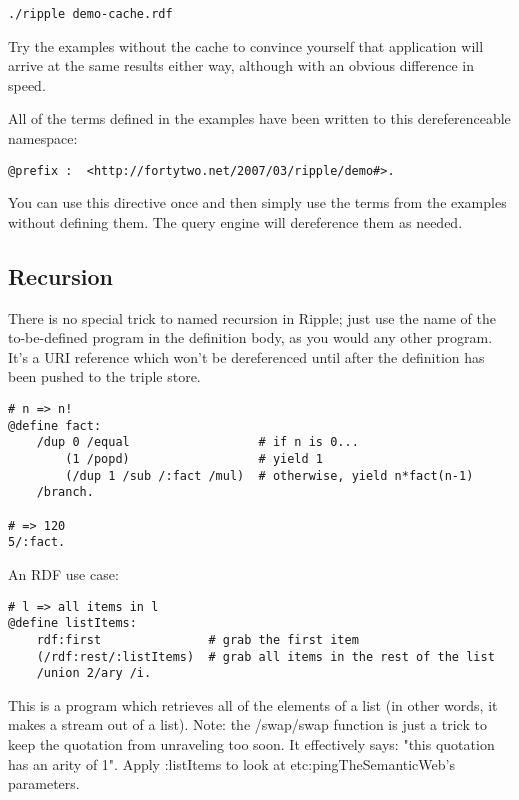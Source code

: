 \documentclass[runningheads]{llncs}
\begin{document}
\begin{verbatim}
./ripple demo-cache.rdf
\end{verbatim}

Try the examples without the cache to convince yourself that application will arrive at the same results either way, although with an obvious difference in speed.

All of the terms defined in the examples have been written to this dereferenceable namespace:

\begin{verbatim}
@prefix :  <http://fortytwo.net/2007/03/ripple/demo#>.
\end{verbatim}

You can use this directive once and then simply use the terms from the examples without defining them.  The query engine will dereference them as needed.



\subsection{Recursion}

There is no special trick to named recursion in Ripple; just use the name of the to-be-defined program in the definition body, as you would any other program.  It's a URI reference which won't be dereferenced until after the definition has been pushed to the triple store.

\begin{verbatim}
# n => n!
@define fact:
    /dup 0 /equal                  # if n is 0...
        (1 /popd)                  # yield 1
        (/dup 1 /sub /:fact /mul)  # otherwise, yield n*fact(n-1)
    /branch.

# => 120
5/:fact.
\end{verbatim}

An RDF use case:

\begin{verbatim}
# l => all items in l
@define listItems:
    rdf:first               # grab the first item
    (/rdf:rest/:listItems)  # grab all items in the rest of the list
    /union 2/ary /i.
\end{verbatim}

This is a program which retrieves all of the elements of a list (in other words, it makes a stream out of a list).  Note: the /swap/swap function is just a trick to keep the quotation from unraveling too soon.  It effectively says: "this quotation has an arity of 1".  Apply :listItems to look at etc:pingTheSemanticWeb's parameters.
\end{document}

